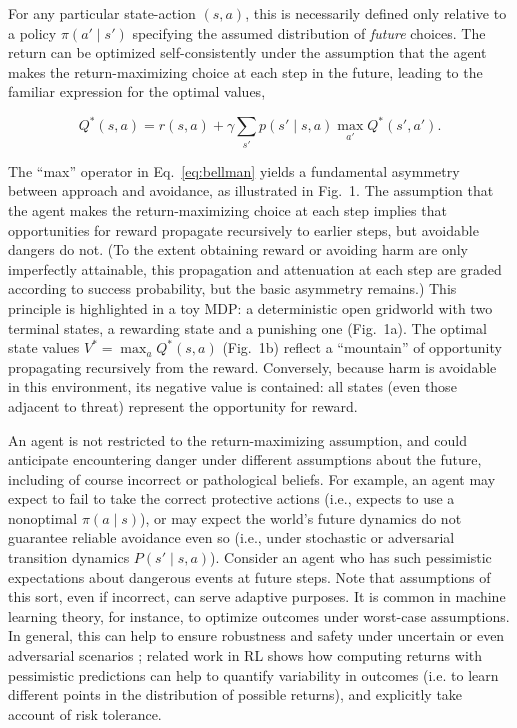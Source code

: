 \documentclass[11pt]{article} %
\begin{document}
For any particular state-action $(s,a)$, this is necessarily defined only relative to a policy $\pi(a' \mid s')$ specifying the assumed distribution of \emph{future} choices. The return can be optimized self-consistently under the assumption that the agent makes the return-maximizing choice at each step in the future, leading to the familiar expression for the optimal values,

\begin{equation}\label{eq:bellman}
 Q^*(s,a) = r(s,a) + \gamma \sum_{s'} p(s' \mid s,a) \max_{a'} Q^*(s',a').
\end{equation}

The ``max'' operator in Eq.~\ref{eq:bellman} yields a fundamental asymmetry between approach and avoidance, as illustrated in Fig.~1. The assumption that the agent makes the return-maximizing choice at each step implies that opportunities for reward propagate recursively to earlier steps, but avoidable dangers do not. (To the extent obtaining reward or avoiding harm are only imperfectly attainable, this propagation and attenuation at each step are graded according to success probability, but the basic asymmetry remains.) This principle is highlighted in a toy MDP: a deterministic open gridworld with two terminal states, a rewarding state and a punishing one (Fig.~1a). The optimal state values $V^* = \max_a Q^*(s,a)$ (Fig.~1b) reflect a ``mountain'' of opportunity propagating recursively from the reward. Conversely, because harm is avoidable in this environment, its negative value is contained: all states (even those adjacent to threat) represent the opportunity for reward.

An agent is not restricted to the return-maximizing assumption, and could anticipate encountering danger under different assumptions about the future, including of course incorrect or pathological beliefs. For example, an agent may expect to fail to take the correct protective actions (i.e., expects to use a nonoptimal $\pi(a \mid s)$), or may expect the world's future dynamics do not guarantee reliable avoidance even so (i.e., under stochastic or adversarial transition dynamics $P(s' \mid s,a)$). Consider an agent who has such pessimistic expectations about dangerous events at future steps. Note that assumptions of this sort, even if incorrect, can serve adaptive purposes. It is common in machine learning theory, for instance, to optimize outcomes under worst-case assumptions. In general, this can help to ensure robustness and safety under uncertain or even adversarial scenarios \cite{Garcia2015}; related work in RL shows how computing returns with pessimistic predictions can help to quantify variability in outcomes (i.e. to learn different points in the distribution of possible returns)\cite{bellemare2017}, and explicitly take account of risk tolerance. 
\end{document}
